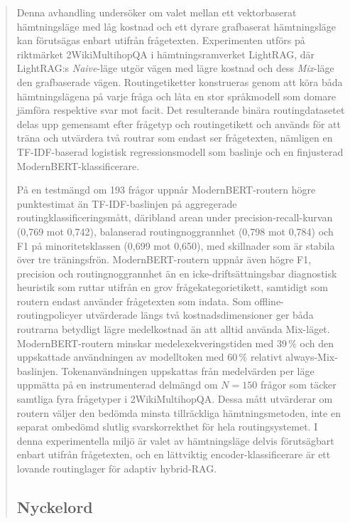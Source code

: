\documentclass[english, bibtex]{kththesis}               %
\newcommand*{\sweExpl}[1]{\todo[inline, backgroundcolor=kth-lightblue40]{#1}}  %
\renewcommand\sweExpl[1]{}
\numberwithin{listing}{chapter}
\begin{document}
\begin{abstract}
\begin{scontents}[store-env=abstracts,print-env=true]
Denna avhandling undersöker om valet mellan ett vektorbaserat hämtningsläge med låg kostnad och ett dyrare grafbaserat hämtningsläge kan förutsägas enbart utifrån frågetexten. Experimenten utförs på riktmärket 2WikiMultihopQA i hämtningsramverket LightRAG, där LightRAG:s \emph{Naive}-läge utgör vägen med lägre kostnad och dess \emph{Mix}-läge den grafbaserade vägen. Routingetiketter konstrueras genom att köra båda hämtningslägena på varje fråga och låta en stor språkmodell som domare jämföra respektive svar mot facit. Det resulterande binära routingdatasetet delas upp gemensamt efter frågetyp och routingetikett och används för att träna och utvärdera två routrar som endast ser frågetexten, nämligen en TF-IDF-baserad logistisk regressionsmodell som baslinje och en finjusterad ModernBERT-klassificerare.

På en testmängd om 193 frågor uppnår ModernBERT-routern högre punktestimat än TF-IDF-baslinjen på aggregerade routing\-klassificeringsmått, däribland arean under precision-recall-kurvan (0,769 mot 0,742), balanserad routingnoggrannhet (0,798 mot 0,784) och F1 på minoritetsklassen (0,699 mot 0,650), med skillnader som är stabila över tre träningsfrön. ModernBERT-routern uppnår även högre F1, precision och routingnoggrannhet än en icke-driftsättningsbar diagnostisk heuristik som ruttar utifrån en grov frågekategorietikett, samtidigt som routern endast använder frågetexten som indata. Som offline-routingpolicyer utvärderade längs två kostnadsdimensioner ger båda routrarna betydligt lägre medelkostnad än att alltid använda Mix-läget. ModernBERT-routern minskar medelexekveringstiden med 39\,\% och den uppskattade användningen av modelltoken med 60\,\% relativt always-Mix-baslinjen. Tokenanvändningen uppskattas från medelvärden per läge uppmätta på en instrumenterad delmängd om \(N = 150\) frågor som täcker samtliga fyra frågetyper i 2WikiMultihopQA. Dessa mått utvärderar om routern väljer den bedömda minsta tillräckliga hämtningsmetoden, inte en separat ombedömd slutlig svarskorrekthet för hela routingsystemet. I denna experimentella miljö är valet av hämtningsläge delvis förutsägbart enbart utifrån frågetexten, och en lättviktig encoder-klassificerare är ett lovande routinglager för adaptiv hybrid-RAG.
\end{scontents}
\subsection*{Nyckelord}
\begin{scontents}[store-env=keywords,print-env=true]
\end{scontents}
\sweExpl{Nyckelord som beskriver innehållet i uppsatsen eller rapporten}
\end{abstract}
\cleardoublepage
{}
\end{document}
